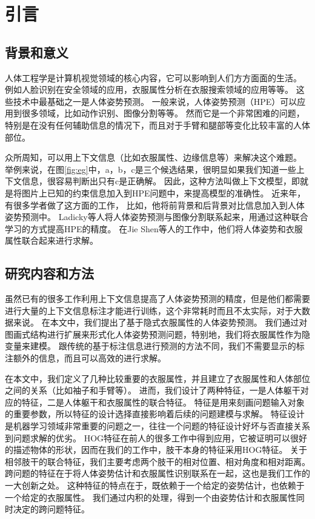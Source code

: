 
\chapter{引言}
\label{chap:intro}

\section{背景和意义}
人体工程学是计算机视觉领域的核心内容，它可以影响到人们方方面面的生活。
例如人脸识别在安全领域的应用，衣服属性分析在衣服搜索领域的应用等等。
这些技术中最基础之一是人体姿势预测。
一般来说，人体姿势预测（HPE）可以应用到很多领域，比如动作识别、图像分割等等。
然而它是一个非常困难的问题，特别是在没有任何辅助信息的情况下，而且对于手臂和腿部等变化比较丰富的人体部位。

众所周知，可以用上下文信息（比如衣服属性、边缘信息等）来解决这个难题。
举例来说，在图\ref{fig:eg}中，a，b，c是三个候选结果，很明显如果我们知道一些上下文信息，很容易判断出只有c是正确解。
因此，这种方法叫做上下文模型，即就是将图片上已知的约束信息加入到HPE问题中，来提高模型的准确性。
近来年，有很多学者做了这方面的工作\cite{deeppose,cvpr09}， 比如\cite{deeppose}，他将前背景和后背景对比信息加入到人体姿势预测中。
Ladicky\cite{cvpr09}等人将人体姿势预测与图像分割联系起来，用通过这种联合学习的方式提高HPE的精度。
在Jie Shen\cite{shen2014unified}等人的工作中，他们将人体姿势和衣服属性联合起来进行求解\cite{cvpr09}。

\section{研究内容和方法}
虽然已有的很多工作利用上下文信息提高了人体姿势预测的精度，但是他们都需要进行大量的上下文信息标注才能进行训练，这个非常耗时而且不太实际，对于大数据来说。
在本文中，我们提出了基于隐式衣服属性的人体姿势预测。
我们通过对图画式结构进行扩展来形式化人体姿势预测问题，特别地，我们将衣服属性作为隐变量来建模。
跟传统的基于标注信息进行预测的方法不同，我们不需要显示的标注额外的信息，而且可以高效的进行求解。


在本文中，我们定义了几种比较重要的衣服属性，并且建立了衣服属性和人体部位之间的关系（比如袖子和手臂等）。
进而，我们设计了两种特征，一是人体躯干对应的特征，二是人体躯干和衣服属性的联合特征。
特征是用来刻画问题输入对象的重要参数，所以特征的设计选择直接影响着后续的问题建模与求解。 特征设计是机器学习领域非常重要的问题之一，往往一个问题的特征设计好坏与否直接关系到问题求解的优劣。 HOG特征在前人的很多工作中得到应用，它被证明可以很好的描述物体的形状，因而在我们的工作中，肢干本身的特征采用HOG特征。 关于相邻肢干的联合特征，我们主要考虑两个肢干的相对位置、相对角度和相对距离。
跨问题的特征在于将人体姿势估计和衣服属性识别联系在一起，这也是我们工作的一大创新之处。 这种特征的特点在于，既依赖于一个给定的姿势估计，也依赖于一个给定的衣服属性。 我们通过内积的处理，得到一个由姿势估计和衣服属性同时决定的跨问题特征。

